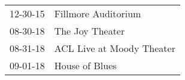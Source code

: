 \begin{supertabular}{p{0.07\textwidth}p{0.23\textwidth}}
 12-30-15 &        Fillmore Auditorium \\
 08-30-18 &           The Joy  Theater \\
 08-31-18 &  ACL Live at Moody Theater \\
 09-01-18 &             House of Blues \\
\end{supertabular}
